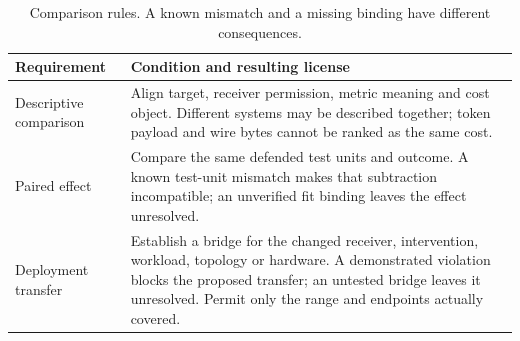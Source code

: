 \begin{table}[t]\centering\footnotesize
\caption{Comparison rules. A known mismatch and a missing binding have different consequences.}\label{tab:comparison-contracts}
\begin{tabularx}{\columnwidth}{@{}p{}Y@{}}\toprule
Requirement & Condition and resulting license\\\midrule
Descriptive comparison & Align target, receiver permission, metric meaning and cost object. Different systems may be described together; token payload and wire bytes cannot be ranked as the same cost.\\
Paired effect & Compare the same defended test units and outcome. A known test-unit mismatch makes that subtraction incompatible; an unverified fit binding leaves the effect unresolved.\\
Deployment transfer & Establish a bridge for the changed receiver, intervention, workload, topology or hardware. A demonstrated violation blocks the proposed transfer; an untested bridge leaves it unresolved. Permit only the range and endpoints actually covered.\\\bottomrule
\end{tabularx}\end{table}
